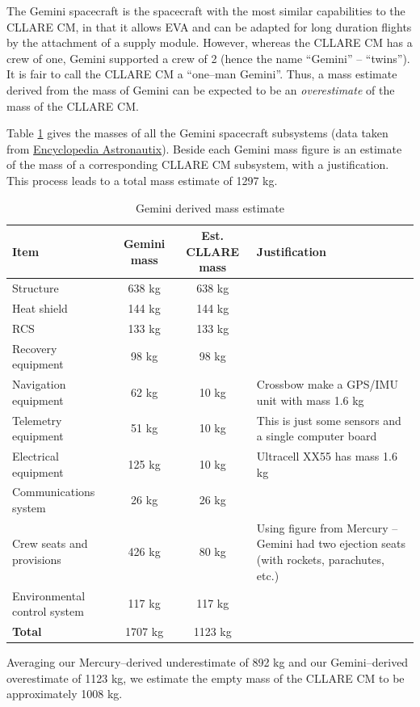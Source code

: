 \documentclass{report}
\begin{document}
The Gemini spacecraft is the spacecraft with the most similar capabilities to the CLLARE CM, in that it allows EVA and can be adapted for long duration flights by the attachment of a supply module.  However, whereas the CLLARE CM has a crew of one, Gemini supported a crew of 2 (hence the name ``Gemini'' -- ``twins'').  It is fair to call the CLLARE CM a ``one--man Gemini''.  Thus, a mass estimate derived from the mass of Gemini can be expected to be an \emph{overestimate} of the mass of the CLLARE CM.

Table \ref{tab:geminimass} gives the masses of all the Gemini spacecraft subsystems (data taken from \href{http://www.astronautix.com/craft/gemini.htm}{Encyclopedia Astronautix}).  Beside each Gemini mass figure is an estimate of the mass of a corresponding CLLARE CM subsystem, with a justification.  This process leads to a total mass estimate of 1297 kg.

\begin{table}
\centering
\begin{tabular}{|l|c|c|l|}
\hline
Item	& Gemini mass & Est. CLLARE mass & Justification \\
\hline \hline
Structure		& 638 kg	& 638 kg &  \\
Heat shield		& 144 kg	& 144 kg & \\
RCS			& 133 kg	& 133 kg & \\
Recovery equipment	& 98 kg		& 98 kg & \\
Navigation equipment	& 62 kg		& 10 kg & Crossbow make a GPS/IMU unit with mass 1.6 kg \\
Telemetry equipment	& 51 kg		& 10 kg & This is just some sensors and a single computer board \\
Electrical equipment	& 125 kg	& 10 kg & Ultracell XX55 has mass 1.6 kg \\
Communications system	& 26 kg		& 26 kg & \\
Crew seats and provisions & 426 kg	& 80 kg & Using figure from Mercury -- Gemini had two ejection seats (with rockets, parachutes, etc.) \\
Environmental control system	&  117 kg		& 117 kg & \\
\hline \hline
\textbf{Total}	& 1707 kg & 1123 kg	& \\
\hline
\end{tabular}
\caption{Gemini derived mass estimate}
\label{tab:geminimass}
\end{table} 

Averaging our Mercury--derived underestimate of 892 kg and our Gemini--derived overestimate of 1123 kg, we estimate the empty mass of the CLLARE CM to be approximately 1008 kg.
\end{document}
